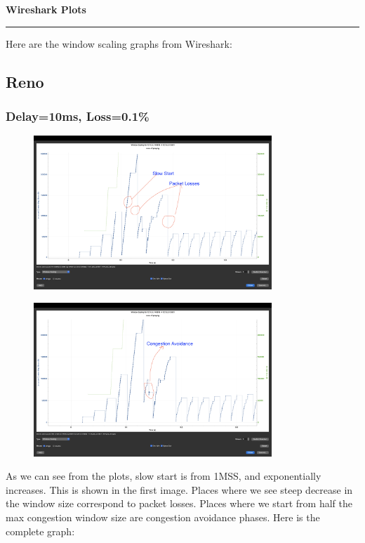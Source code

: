 \documentclass[a4paper,12pt]{article}
\newenvironment{solution}[2][]{%
    \begin{mdframed}[linecolor=blue!70!black, linewidth=2pt, roundcorner=10pt, backgroundcolor=yellow!10!white, skipabove=12pt, skipbelow=12pt]%
        \textbf{\large #2}
        \par\noindent\rule{\textwidth}{0.4pt}
}{
    \end{mdframed}
}
\begin{document}
\begin{solution}{Wireshark Plots}
    Here are the window scaling graphs from Wireshark:

    \subsection*{Reno}
    \subsubsection*{Delay=10ms, Loss=0.1\%}

    \begin{figure}[H]
        \centering
        \includegraphics[width=0.8\textwidth]{reno-e11.png}
    \end{figure}

    \begin{figure}[H]
        \centering
        \includegraphics[width=0.8\textwidth]{reno-e12.png}
    \end{figure}

    As we can see from the plots, slow start is from 1MSS, and exponentially increases. This is shown in the first image. Places where we see steep decrease in the window size correspond to packet losses. Places where we start from half the max congestion window size are congestion avoidance phases.
    Here is the complete graph:


\end{solution}
\end{document}
